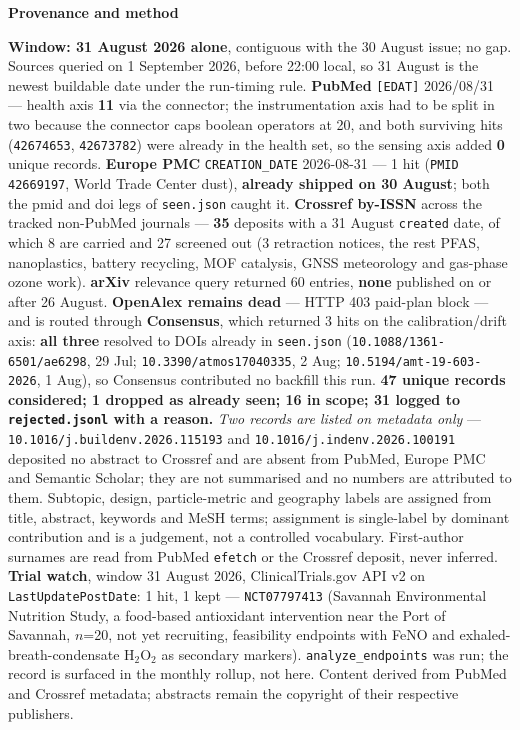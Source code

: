 \documentclass[10pt]{article}
\begin{document}
\vspace{4mm}
\begin{keybox}
{\sffamily\bfseries\footnotesize\color{Deep}Provenance and method}\\[1.2mm]
{\fontsize{7.2}{8.8}\selectfont
\textbf{Window: 31 August 2026 alone}, contiguous with the 30 August issue; no gap. Sources
queried on 1 September 2026, before 22:00 local, so 31 August is the newest buildable date
under the run-timing rule. \textbf{PubMed} \texttt{[EDAT]} 2026/08/31 --- health axis
\textbf{11} via the connector; the instrumentation axis had to be split in two because the
connector caps boolean operators at 20, and both surviving hits (\texttt{42674653},
\texttt{42673782}) were already in the health set, so the sensing axis added \textbf{0}
unique records. \textbf{Europe PMC} \texttt{CREATION\_DATE} 2026-08-31 --- 1 hit
(\texttt{PMID 42669197}, World Trade Center dust), \textbf{already shipped on 30 August};
both the pmid and doi legs of \texttt{seen.json} caught it. \textbf{Crossref by-ISSN}
across the tracked non-PubMed journals --- \textbf{35} deposits with a 31 August
\texttt{created} date, of which 8 are carried and 27 screened out (3 retraction notices,
the rest PFAS, nanoplastics, battery recycling, MOF catalysis, GNSS meteorology and
gas-phase ozone work). \textbf{arXiv} relevance query returned 60 entries, \textbf{none}
published on or after 26 August. \textbf{OpenAlex remains dead} --- HTTP 403 paid-plan
block --- and is routed through \textbf{Consensus}, which returned 3 hits on the
calibration/drift axis: \textbf{all three} resolved to DOIs already in \texttt{seen.json}
(\texttt{10.1088/1361-6501/ae6298}, 29 Jul; \texttt{10.3390/atmos17040335}, 2 Aug;
\texttt{10.5194/amt-19-603-2026}, 1 Aug), so Consensus contributed no backfill this run.
\textbf{47 unique records considered; 1 dropped as already seen; 16 in scope; 31 logged to
\texttt{rejected.jsonl} with a reason.}
\emph{Two records are listed on metadata only} --- \texttt{10.1016/j.buildenv.2026.115193}
and \texttt{10.1016/j.indenv.2026.100191} deposited no abstract to Crossref and are absent
from PubMed, Europe PMC and Semantic Scholar; they are not summarised and no numbers are
attributed to them.
Subtopic, design, particle-metric and geography labels are assigned from title, abstract,
keywords and MeSH terms; assignment is single-label by dominant contribution and is a
judgement, not a controlled vocabulary. First-author surnames are read from PubMed
\texttt{efetch} or the Crossref deposit, never inferred.
\textbf{Trial watch}, window 31 August 2026, ClinicalTrials.gov API v2 on
\texttt{LastUpdatePostDate}: 1 hit, 1 kept --- \texttt{NCT07797413} (Savannah Environmental
Nutrition Study, a food-based antioxidant intervention near the Port of Savannah, $n$=20,
not yet recruiting, feasibility endpoints with FeNO and exhaled-breath-condensate
H$_2$O$_2$ as secondary markers). \texttt{analyze\_endpoints} was run; the record is
surfaced in the monthly rollup, not here.
Content derived from PubMed and Crossref metadata; abstracts remain the copyright of their
respective publishers.\par}
\end{keybox}
\end{document}
